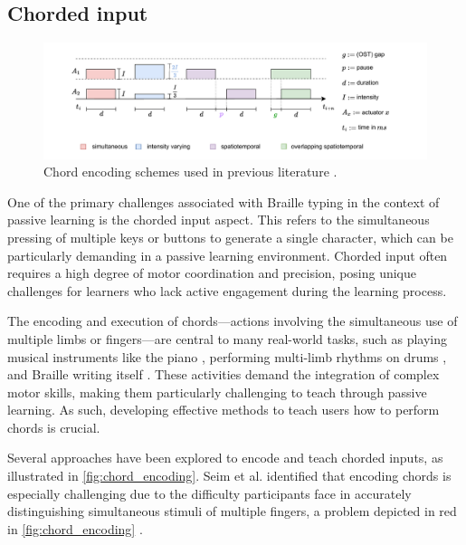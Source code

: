 \subsection*{Chorded input}
\begin{figure}
    \centering
    \includegraphics[width=\linewidth]{src//pictures/ost_diagram.drawio.pdf}
    \caption{Chord encoding schemes used in previous literature \cite{Luzhnica2017,Luzhnica2016,Luzhnica2018,Luzhnica2018a}.}
    \label{fig:chord_encoding}
\end{figure}

One of the primary challenges associated with Braille typing in the context of passive learning is the chorded input aspect. This refers to the simultaneous pressing of multiple keys or buttons to generate a single character, which can be particularly demanding in a passive learning environment. Chorded input often requires a high degree of motor coordination and precision, posing unique challenges for learners who lack active engagement during the learning process.

The encoding and execution of chords—actions involving the simultaneous use of multiple limbs or fingers—are central to many real-world tasks, such as playing musical instruments like the piano \cite{Seim2014, Seim2015b, Huang2008, Kohlsdorf2010, Huang2010, Seim2014a, Vaio6810, Donchev2021, Fang2023a, Fang2023}, performing multi-limb rhythms on drums \cite{Bouwer2011, Holland2010}, and Braille writing itself \cite{Learning2024, Seim2017, Seim2014a}. These activities demand the integration of complex motor skills, making them particularly challenging to teach through passive learning. As such, developing effective methods to teach users how to perform chords is crucial.

Several approaches have been explored to encode and teach chorded inputs, as illustrated in \autoref{fig:chord_encoding}. Seim et al. identified that encoding chords is especially challenging due to the difficulty participants face in accurately distinguishing simultaneous stimuli of multiple fingers, a problem depicted in red in \autoref{fig:chord_encoding} \cite{Seim2014, Seim2015}. 

